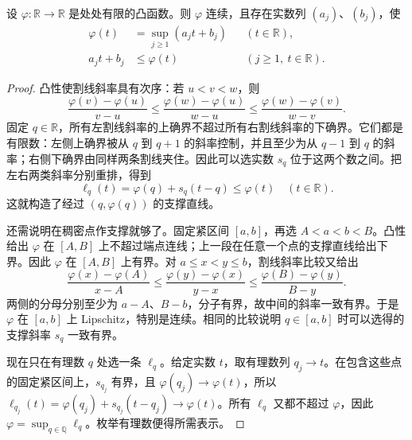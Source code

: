 \begin{lemma}[凸函数的可数支撑表示]\label{b1:lem:convex-countable-support-31}
设 \(\varphi:\mathbb R\rightarrow\mathbb R\) 是处处有限的凸函数。则 \(\varphi\) 连续，且存在实数列 \((a_j)\)、\((b_j)\)，使
\[
 \begin{aligned}
  \varphi(t)&=\sup_{j\geq1}(a_jt+b_j)
    &&(t\in\mathbb R),\\
  a_jt+b_j&\leq\varphi(t)
    &&(j\geq1,\ t\in\mathbb R).
 \end{aligned}
\]
\end{lemma}
\begin{proof}
凸性使割线斜率具有次序：若 \(u<v<w\)，则
\[
 \frac{\varphi(v)-\varphi(u)}{v-u}
 \leq\frac{\varphi(w)-\varphi(u)}{w-u}
 \leq\frac{\varphi(w)-\varphi(v)}{w-v}.
\]
固定 \(q\in\mathbb R\)，所有左割线斜率的上确界不超过所有右割线斜率的下确界。它们都是有限数：左侧上确界被从 \(q\) 到 \(q+1\) 的斜率控制，并且至少为从 \(q-1\) 到 \(q\) 的斜率；右侧下确界由同样两条割线夹住。因此可以选实数 \(s_q\) 位于这两个数之间。把左右两类斜率分别重排，得到
\[
 \ell_q(t)=\varphi(q)+s_q(t-q)\leq\varphi(t)
 \quad(t\in\mathbb R).
\]
这就构造了经过 \((q,\varphi(q))\) 的支撑直线。

还需说明在稠密点作支撑就够了。固定紧区间 \([a,b]\)，再选 \(A<a<b<B\)。凸性给出 \(\varphi\) 在 \([A,B]\) 上不超过端点连线；上一段在任意一个点的支撑直线给出下界。因此 \(\varphi\) 在 \([A,B]\) 上有界。对 \(a\leq x<y\leq b\)，割线斜率比较又给出
\[
 \frac{\varphi(x)-\varphi(A)}{x-A}
 \leq\frac{\varphi(y)-\varphi(x)}{y-x}
 \leq\frac{\varphi(B)-\varphi(y)}{B-y}.
\]
两侧的分母分别至少为 \(a-A\)、\(B-b\)，分子有界，故中间的斜率一致有界。于是 \(\varphi\) 在 \([a,b]\) 上 Lipschitz，特别是连续。相同的比较说明 \(q\in[a,b]\) 时可以选得的支撑斜率 \(s_q\) 一致有界。

现在只在有理数 \(q\) 处选一条 \(\ell_q\)。给定实数 \(t\)，取有理数列 \(q_j\to t\)。在包含这些点的固定紧区间上，\(s_{q_j}\) 有界，且 \(\varphi(q_j)\to\varphi(t)\)，所以
\(\ell_{q_j}(t)=\varphi(q_j)+s_{q_j}(t-q_j)\to\varphi(t)\)。所有 \(\ell_q\) 又都不超过 \(\varphi\)，因此 \(\varphi=\sup_{q\in\mathbb Q}\ell_q\)。枚举有理数便得所需表示。
\end{proof}

